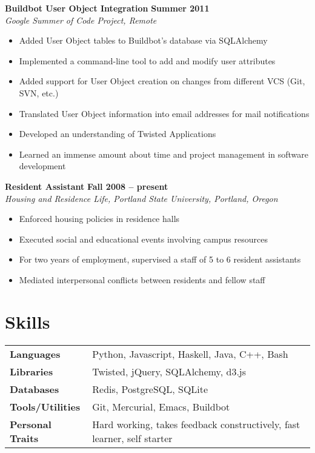 \documentclass[margin,line]{resume}
\begin{document}
\begin{resume}
    \textbf{Buildbot User Object Integration} \hfill \textbf{Summer 2011} \vspace{2mm}\\\vspace{1mm}%
    \textsl{Google Summer of Code Project, Remote}
    \begin{itemize}
        \item Added User Object tables to Buildbot's database via SQLAlchemy
        \item Implemented a command-line tool to add and modify user attributes
        \item Added support for User Object creation on changes from different VCS (Git, SVN, etc.)
        \item Translated User Object information into email addresses for mail notifications
        \item Developed an understanding of Twisted Applications
        \item Learned an immense amount about time and project management in software development
    \end{itemize}

    \textbf{Resident Assistant} \hfill \textbf{Fall 2008 -- present} \vspace{2mm}\\\vspace{1mm}%
    \textsl{Housing and Residence Life, Portland State University, Portland, Oregon}
    \begin{itemize}
        \item Enforced housing policies in residence halls
        \item Executed social and educational events involving campus resources
        \item For two years of employment, supervised a staff of 5 to 6 resident assistants
        \item Mediated interpersonal conflicts between residents and fellow staff
    \end{itemize}

    \section{\mysidestyle Skills}

    \vspace{1mm}
    \begin{tabular}{@{}l|l}
        \textbf{Languages}       & Python, Javascript, Haskell, Java, C++, Bash\\[1mm]
        \textbf{Libraries}       & Twisted, jQuery, SQLAlchemy, d3.js\\[1mm]
        \textbf{Databases}       & Redis, PostgreSQL, SQLite\\[1mm]
        \textbf{Tools/Utilities} & Git, Mercurial, Emacs, Buildbot\\[1mm]
        \textbf{Personal Traits} & Hard working, takes feedback constructively, fast learner, self starter
    \end{tabular}


\end{resume}
\end{document}
